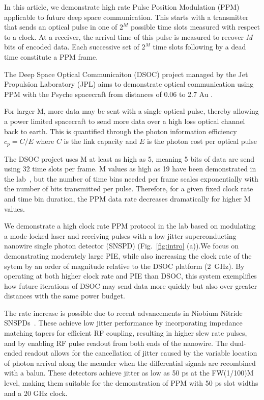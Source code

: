 \documentclass[11pt]{caltech_thesis} %
\begin{document}
In this article, we demonstrate high rate Pulse Position Modulation (PPM) applicable to future deep space communication. This starts with a transmitter that sends an optical pulse in one of $2^M$ possible time slots measured with respect to a clock. At a receiver, the arrival time of this pulse is measured to recover $M$ bits of encoded data. Each successive set of $2^M$ time slots following by a dead time constitute a PPM frame.

The Deep Space Optical Communicaiton (DSOC) project managed by the Jet Propulsion Laboratory (JPL) aims to demonstrate optical communication using PPM with the Psyche spacecraft from distances of 0.06 to 2.7 Au \autocite{Srinivasan2023GroundReceiver}.

For larger M, more data may be sent with a single optical pulse, thereby allowing a power limited spacecraft to send more data over a high loss optical channel back to earth. This is quantified through the photon information efficiency $c_p = C/E$ where $C$ is the link capacity and $E$ is the photon cost per optical pulse

The DSOC project uses M at least as high as 5, meaning 5 bits of data are send using 32 time slots per frame. M values as high as 19 have been demonstrated in the lab~\autocite{essiambre2023record}, but the number of time bins needed per frame scales exponentially with the number of bits transmitted per pulse. Therefore, for a given fixed clock rate and time bin duration, the PPM data rate decreases dramatically for higher M values.

We demonstrate a high clock rate PPM protocol in the lab based on modulating a mode-locked laser and receiving pulses with a low jitter superconducting nanowire single photon detector (SNSPD) (Fig.~\ref{fig:intro} (a)).We focus on demonstrating moderately large PIE, while also increasing the clock rate of the sytem by an order of magnitude relative to the DSOC platform (2~GHz). By operating at both higher clock rate and PIE than DSOC, this system exemplifies how future iterations of DSOC may send data more quickly but also over greater distances with the same power budget.

The rate increase is possible due to recent advancements in Niobium Nitride SNSPDs~\autocite{Colangelo2023}. These achieve low jitter performance by incorporating impedance matching tapers for efficient RF coupling, resulting in higher slew rate pulses, and by enabling RF pulse readout from both ends of the nanowire. The dual-ended readout allows for the cancellation of jitter caused by the variable location of photon arrival along the meander when the differential signals are recombined with a balun. These detectors achieve jitter as low as 50 ps at the FW(1/100)M level, making them suitable for the demonstration of PPM with 50 ps slot widths and a 20 GHz clock.
\end{document}
